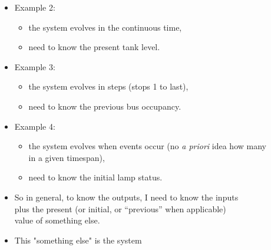 \begin{frame}
\myPause
 \begin{itemize}[<+-| alert@+>]
 \item Example 2:
       \begin{itemize}[<+-| alert@+>]
       \item the system evolves in the continuous time,
       \item need to know the present tank level.
       \end{itemize}
 \item Example 3:
       \begin{itemize}[<+-| alert@+>]
       \item the system evolves in steps (stops 1 to last),
       \item need to know the previous bus occupancy.
       \end{itemize}
 \item Example 4:
       \begin{itemize}[<+-| alert@+>]
       \item the system evolves when events occur (no \emph{a priori} idea how many\\
             in a given timespan),
       \item need to know the initial lamp status.
       \end{itemize}
 \item \vfill So in general, to know the outputs, I need to know the inputs\\
       plus the present (or initial, or ``previous'' when applicable)\\
       value of something else.
 \item This "something else" is the system 
 \end{itemize}
\end{frame}

